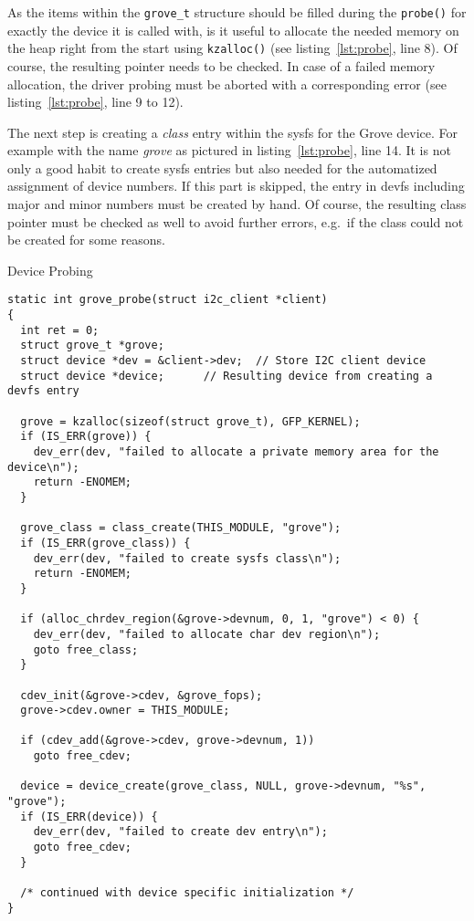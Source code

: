 As the items within the \texttt{grove\_t} structure should be filled during the \texttt{probe()} for exactly the device it is called with, is it useful to allocate the needed memory on the heap right from the start using \texttt{kzalloc()} (see listing~\ref{lst:probe}, line 8).
Of course, the resulting pointer needs to be checked.
In case of a failed memory allocation, the driver probing must be aborted with a corresponding error (see listing~\ref{lst:probe}, line 9 to 12).

The next step is creating a \textit{class} entry within the sysfs for the Grove device.
For example with the name \textit{grove} as pictured in listing~\ref{lst:probe}, line 14.
It is not only a good habit to create sysfs entries but also needed for the automatized assignment of device numbers.
If this part is skipped, the entry in devfs including major and minor numbers must be created by hand.
Of course, the resulting class pointer must be checked as well to avoid further errors, e.g.\ if the class could not be created for some reasons.

\begin{listing} [H]
    \caption{Device Probing}
    \label{lst:probe}
    \begin{verbatim}
static int grove_probe(struct i2c_client *client)
{
  int ret = 0;
  struct grove_t *grove;
  struct device *dev = &client->dev;  // Store I2C client device
  struct device *device;      // Resulting device from creating a devfs entry

  grove = kzalloc(sizeof(struct grove_t), GFP_KERNEL);
  if (IS_ERR(grove)) {
  	dev_err(dev, "failed to allocate a private memory area for the device\n");
	return -ENOMEM;
  }

  grove_class = class_create(THIS_MODULE, "grove");
  if (IS_ERR(grove_class)) {
    dev_err(dev, "failed to create sysfs class\n");
	return -ENOMEM;
  }

  if (alloc_chrdev_region(&grove->devnum, 0, 1, "grove") < 0) {
	dev_err(dev, "failed to allocate char dev region\n");
	goto free_class;
  }

  cdev_init(&grove->cdev, &grove_fops);
  grove->cdev.owner = THIS_MODULE;

  if (cdev_add(&grove->cdev, grove->devnum, 1))
	goto free_cdev;

  device = device_create(grove_class, NULL, grove->devnum, "%s", "grove");
  if (IS_ERR(device)) {
	dev_err(dev, "failed to create dev entry\n");
	goto free_cdev;
  }
  
  /* continued with device specific initialization */
}
    \end{verbatim}
\end{listing}

